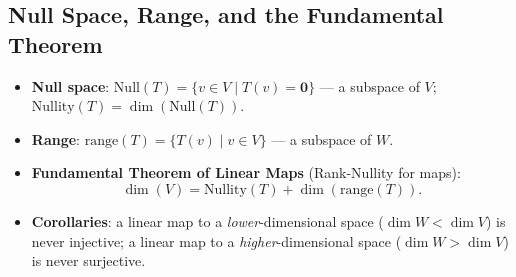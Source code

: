 \documentclass[hidelinks]{article}
\begin{document}
\subsection{Null Space, Range, and the Fundamental Theorem}
\begin{itemize}
    \item \textbf{Null space}: $\mathrm{Null}(T) = \{v\in V \mid T(v) = \mathbf{0}\}$ — a subspace of $V$; $\mathrm{Nullity}(T) = \dim(\mathrm{Null}(T))$.
    \item \textbf{Range}: $\mathrm{range}(T) = \{T(v) \mid v\in V\}$ — a subspace of $W$.
    \item \textbf{Fundamental Theorem of Linear Maps} (Rank-Nullity for maps):
    \[
        \dim(V) = \mathrm{Nullity}(T) + \dim(\mathrm{range}(T)).
    \]
    \item \textbf{Corollaries}: a linear map to a \emph{lower}-dimensional space ($\dim W < \dim V$) is never injective; a linear map to a \emph{higher}-dimensional space ($\dim W > \dim V$) is never surjective.
\end{itemize}
\end{document}
